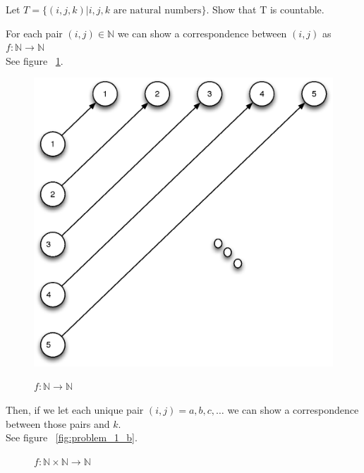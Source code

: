 




\homeworkheader{\classnameandsection}

\begin{problem}{1}
  Let $T = \{(i,j,k) | i,j,k \text{ are natural numbers}\}$. Show that T is countable.
  \begin{solution}
    For each pair $(i,j) \in \mathbb{N}$ we can show a correspondence between $(i,j)$ as $f: \mathbb{N} \rightarrow
    \mathbb{N}$ \\
    See figure ~\ref{fig:problem_1_a}.
    \begin{figure}[H]
      \centering
      \caption{$f: \mathbb{N} \rightarrow \mathbb{N}$}
      \includegraphics[scale=.5]{problem_1_a.eps}
      \label{fig:problem_1_a}
    \end{figure}
    \noindent Then, if we let each unique pair $(i,j) = a, b, c, \ldots$ we can show a correspondence between those pairs and $k$.\\
    See figure ~\ref{fig:problem_1_b}.
    \begin{figure}[H]
      \centering
      \caption{$f: \mathbb{N} \times \mathbb{N} \rightarrow \mathbb{N}$}

\end{figure}
\end{solution}
\end{problem}
